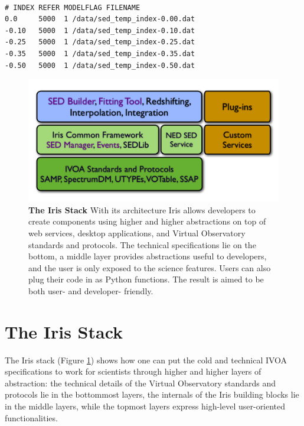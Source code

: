 \documentclass[final,5p,authoryear]{elsarticle}
\begin{document}
\begin{lstlisting}[style=code,
	caption=Example of template library definition file,
	label=lst:templateconfig]

# INDEX REFER MODELFLAG FILENAME
0.0     5000  1	/data/sed_temp_index-0.00.dat
-0.10   5000  1 /data/sed_temp_index-0.10.dat
-0.25   5000  1 /data/sed_temp_index-0.25.dat
-0.35   5000  1 /data/sed_temp_index-0.35.dat
-0.50   5000  1 /data/sed_temp_index-0.50.dat
\end{lstlisting}

\begin{figure}
\begin{center}
\includegraphics[width=1.0\columnwidth]{figures/IrisStack.png} \caption{\textbf{The
Iris Stack} With its architecture Iris allows developers to create components
using higher and higher abstractions on top of web services, desktop
applications, and Virtual Observatory standards and protocols. The technical
specifications lie on the bottom, a middle layer provides abstractions useful to
developers, and the user is only exposed to the science features. Users can also
plug their code in as Python functions. The result is aimed to be both user- and
developer- friendly.}
\label{fig:stack}
\end{center}
\end{figure}

\section{The Iris Stack} \label{sec:stack}

The Iris stack (Figure \ref{fig:stack}) shows how one can put the cold and
technical IVOA specifications to work for scientists through higher and higher
layers of abstraction: the technical details of the Virtual Observatory
standards and protocols lie in the bottommost layers, the internals of the Iris
building blocks lie in the middle layers, while the topmost layers express
high-level user-oriented functionalities.
\end{document}
